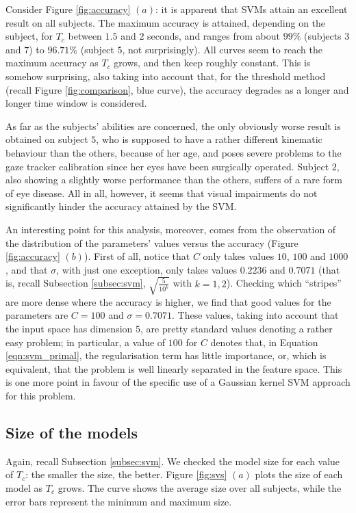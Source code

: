 \documentclass[a4paper,10pt,conference]{ieeeconf}
\begin{document}
Consider Figure \ref{fig:accuracy} $(a)$: it is apparent that SVMs
attain an excellent result on all subjects. The maximum accuracy is
attained, depending on the subject, for $T_c$ between $1.5$ and $2$
seconds, and ranges from about $99\%$ (subjects $3$ and $7$) to
$96.71\%$ (subject $5$, not surprisingly). All curves seem to reach
the maximum accuracy as $T_c$ grows, and then keep roughly
constant. This is somehow surprising, also taking into account that,
for the threshold method (recall Figure \ref{fig:comparison}, blue
curve), the accuracy degrades as a longer and longer time window is
considered.

As far as the subjects' abilities are concerned, the only obviously
worse result is obtained on subject $5$, who is supposed to have a
rather different kinematic behaviour than the others, because of her
age, and poses severe problems to the gaze tracker calibration since
her eyes have been surgically operated. Subject $2$, also showing a
slightly worse performance than the others, suffers of a rare form of
eye disease. All in all, however, it seems that visual impairments do
not significantly hinder the accuracy attained by the SVM.

An interesting point for this analysis, moreover, comes from the
observation of the distribution of the parameters' values versus the
accuracy (Figure \ref{fig:accuracy} $(b)$). First of all, notice that
$C$ only takes values $10$, $100$ and $1000$, and that $\sigma$, with
just one exception, only takes values $0.2236$ and $0.7071$ (that is,
recall Subsection \ref{subsec:svm}, $\sqrt{\frac{5}{10^{k}}}$ with
$k=1,2$). Checking which ``stripes'' are more dense where the accuracy
is higher, we find that good values for the parameters are $C=100$ and
$\sigma=0.7071$. These values, taking into account that the input
space has dimension $5$, are pretty standard values denoting a rather
easy problem; in particular, a value of $100$ for $C$ denotes that, in
Equation \ref{eqn:svm_primal}, the regularisation term has little
importance, or, which is equivalent, that the problem is well linearly
separated in the feature space. This is one more point in favour of
the specific use of a Gaussian kernel SVM approach for this
problem.

\subsection{Size of the models}

Again, recall Subsection \ref{subsec:svm}. We checked the model size
for each value of $T_c$: the smaller the size, the better. Figure
\ref{fig:svs} $(a)$ plots the size of each model as $T_c$ grows. The
curve shows the average size over all subjects, while the error bars
represent the minimum and maximum size.
\end{document}
